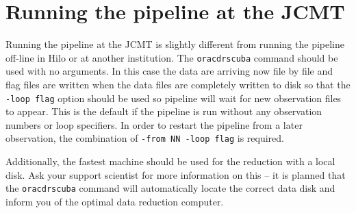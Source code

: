 \documentclass[twoside,11pt]{article}
\newcommand{\xlabel}[1]{}
\renewcommand{\_}{\texttt{\symbol{95}}}
\begin{document}
\section{Running the pipeline at the JCMT\xlabel{running_the_pipeline_at_the_jcmt}}

Running the pipeline at the JCMT is slightly different from running the pipeline
off-line in Hilo or at another institution.  The \texttt{oracdr\_scuba} command
should be used with no arguments.  In this case the data are arriving now file
by file and flag files are written when the data files are completely written
to disk so that the \texttt{-loop flag} option should be used so pipeline will
wait for new observation files to appear. This is the default if the pipeline
is run without any observation numbers or loop specifiers.  In order to
restart the pipeline from a later observation, the combination of
\texttt{-from NN -loop flag} is required.

Additionally, the fastest machine should be used for the reduction
with a local disk. Ask your support scientist for more information
on this -- it is planned that the \texttt{oracdr\_scuba} command
will automatically locate the correct data disk and inform you
of the optimal data reduction computer.



\end{document}
